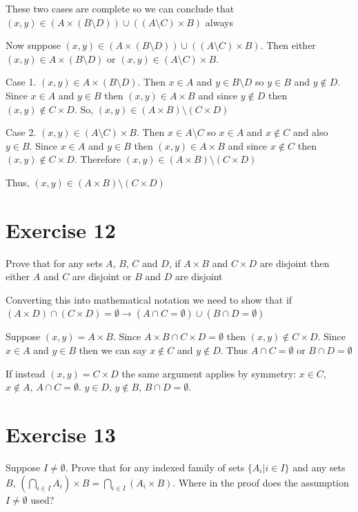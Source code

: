 \documentclass[11pt]{article}
\newcommand{\then}{\rightarrow}
\begin{document}
These two cases are complete so we can conclude that 
$(x, y) \in (A \times (B \setminus D)) \cup ((A \setminus C) \times B)$ always

Now suppose $(x, y) \in (A \times (B \setminus D)) \cup ((A \setminus C) \times B)$.
Then either $(x, y) \in A \times (B \setminus D)$ or 
$(x, y) \in (A \setminus C) \times B$.

Case 1. $(x, y) \in A \times (B \setminus D)$. Then $x \in A$ and $y \in B \setminus D$
so $y \in B$ and $y \notin D$. Since $x \in A$ and $y \in B$ then 
$(x, y) \in A \times B$ and since $y \notin D$ then $(x, y) \notin C \times D$.
So, $(x, y) \in (A \times B) \setminus (C \times D)$

Case 2. $(x, y) \in (A \setminus C) \times B$. Then $x \in A \setminus C$ so 
$x \in A$ and $x \notin C$ and also $y \in B$. Since $x \in A$ and $y \in B$
then $(x, y) \in A \times B$ and since $x \notin C$ then $(x, y) \notin C \times D$.
Therefore $(x, y) \in (A \times B) \setminus (C \times D)$

Thus, $(x, y) \in (A \times B) \setminus (C \times D)$

\section*{Exercise 12}

Prove that for any sets $A$, $B$, $C$ and $D$, if $A \times B$ and $C \times D$ 
are disjoint then either $A$ and $C$ are disjoint or $B$ and $D$ are disjoint

Converting this into mathematical notation we need to show that if 
$(A \times D) \cap (C \times D) = \emptyset \then (A \cap C = \emptyset) \cup 
(B \cap D = \emptyset)$

Suppose $(x, y) = A \times B$. Since $A \times B \cap C \times D = \emptyset$
then $(x, y) \notin C \times D$. Since $x \in A$ and $y \in B$ then we can say 
$x \notin C$ and $y \notin D$. Thus $A \cap C = \emptyset$ or $B \cap D = \emptyset$

If instead $(x, y) = C \times D$ the same argument applies by symmetry: 
$x \in C$, $x \notin A$, $A \cap C = \emptyset$. $y \in D$, $y \notin B$,
$B \cap D = \emptyset$.

\section*{Exercise 13}

Suppose $I \neq \emptyset$. Prove that for any indexed family of sets 
$\{ A_i | i \in I\}$ and any sets $B$, 
$(\bigcap_{i \in I} A_i) \times B = \bigcap_{i \in I} (A_i \times B)$.
Where in the proof does the assumption $I \neq \emptyset$ used?
\end{document}

